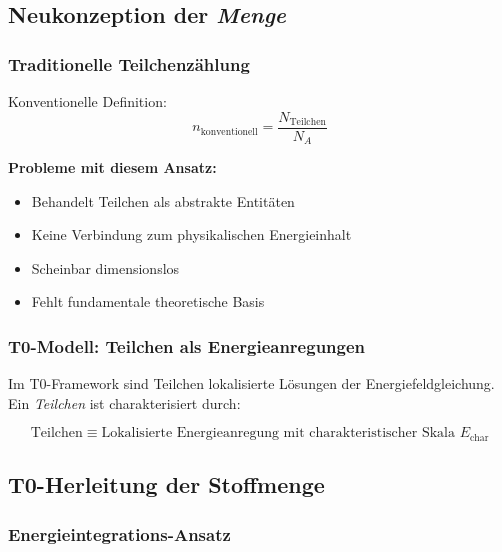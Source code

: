 \documentclass[12pt,a4paper]{article}
\newcommand{\Echar}{E_{\text{char}}}
\begin{document}
	\subsection{Neukonzeption der \textit{Menge}}
	\label{subsec:neukonzeption_menge}
	
	\subsubsection{Traditionelle Teilchenzählung}
	\label{subsubsec:traditionelle_zaehlung}
	
	Konventionelle Definition:
	\begin{equation}
		n_{\text{konventionell}} = \frac{N_{\text{Teilchen}}}{N_A}
		\label{eq:konventionelles_mol}
	\end{equation}
	
	\textbf{Probleme mit diesem Ansatz:}
	\begin{itemize}
		\item Behandelt Teilchen als abstrakte Entitäten
		\item Keine Verbindung zum physikalischen Energieinhalt
		\item Scheinbar dimensionslos
		\item Fehlt fundamentale theoretische Basis
	\end{itemize}
	
	\subsubsection{T0-Modell: Teilchen als Energieanregungen}
	\label{subsubsec:t0_teilchen_energie}
	
	Im T0-Framework sind Teilchen lokalisierte Lösungen der Energiefeldgleichung. Ein \textit{Teilchen} ist charakterisiert durch:
	
	\begin{equation}
		\text{Teilchen} \equiv \text{Lokalisierte Energieanregung mit charakteristischer Skala } \Echar
		\label{eq:t0_teilchen_definition}
	\end{equation}
	
	\subsection{T0-Herleitung der Stoffmenge}
	\label{subsec:t0_mol_herleitung}
	
	\subsubsection{Energieintegrations-Ansatz}
	\label{subsubsec:energieintegration}
	
\end{document}
